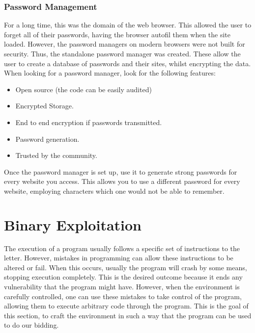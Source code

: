 \documentclass[a4paper,11pt]{report}
\begin{document}
		\subsection{Password Management}
			For a long time, this was the domain of the web browser. 
			This allowed the user to forget all of their passwords, having the browser autofil them when the site loaded.
			However, the password managers on modern browsers were not built for security. 
			Thus, the standalone password manager was created. 
			These allow the user to create a database of passwords and their sites, whilst encrypting the data. 
			When looking for a password manager, look for the following features:
			\begin{itemize}
				\item Open source (the code can be easily audited)
				\item Encrypted Storage. 
				\item End to end encryption if passwords transmitted.
				\item Password generation. 
				\item Trusted by the community. 
			\end{itemize}
			Once the password manager is set up, use it to generate strong passwords for every website you access. 
			This allows you to use a different password for every website, employing characters which one would not be able to remember. 

\chapter{Binary Exploitation}
	\label{ch:BinaryExploitation}
		The execution of a program usually follows a specific set of instructions to the letter. 
		However, mistakes in programming can allow these instructions to be altered or fail. 
		When this occurs, usually the program will crash by some means, stopping execution completely. 
		This is the desired outcome because it ends any vulnerability that the program might have. 
		However, when the environment is carefully controlled, one can use these mistakes to take control of the program, 
		allowing them to execute arbitrary code through the program.\cite{HackingAOE} 
		This is the goal of this section, to craft the environment in such a way that the program can be used to do our bidding. 
\end{document}
